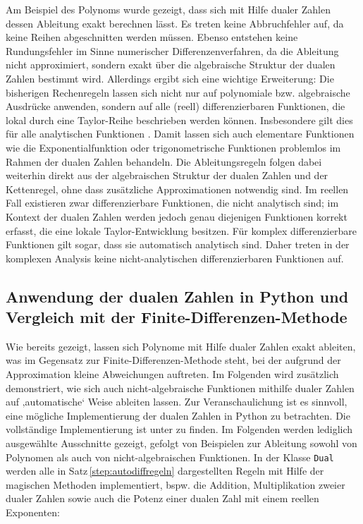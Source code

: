 Am Beispiel des Polynoms wurde gezeigt, dass sich mit Hilfe dualer Zahlen dessen Ableitung exakt berechnen lässt.
Es treten keine Abbruchfehler auf, da keine Reihen abgeschnitten werden müssen. 
Ebenso entstehen keine Rundungsfehler im Sinne numerischer Differenzenverfahren, da die Ableitung nicht approximiert, sondern exakt über die algebraische Struktur der dualen Zahlen bestimmt wird.
Allerdings ergibt sich eine wichtige Erweiterung: Die bisherigen Rechenregeln lassen sich nicht nur auf polynomiale bzw. algebraische Ausdrücke anwenden, sondern auf alle (reell) differenzierbaren Funktionen, die lokal durch eine Taylor-Reihe beschrieben werden können.
Insbesondere gilt dies für alle analytischen Funktionen \cite{step:baydin2018}.
Damit lassen sich auch elementare Funktionen wie die Exponentialfunktion oder trigonometrische Funktionen problemlos im Rahmen der dualen Zahlen behandeln.
Die Ableitungsregeln folgen dabei weiterhin direkt aus der algebraischen Struktur der dualen Zahlen und der Kettenregel, ohne dass zusätzliche Approximationen notwendig sind.
Im reellen Fall existieren zwar differenzierbare Funktionen, die nicht analytisch sind; im Kontext der dualen Zahlen werden jedoch genau diejenigen Funktionen korrekt erfasst, die eine lokale Taylor-Entwicklung besitzen.
Für komplex differenzierbare Funktionen gilt sogar, dass sie automatisch analytisch sind.
Daher treten in der komplexen Analysis keine nicht-analytischen differenzierbaren Funktionen auf.

\subsection{Anwendung der dualen Zahlen in Python und Vergleich mit der Finite-Differenzen-Methode}
%

Wie bereits gezeigt, lassen sich Polynome mit Hilfe dualer Zahlen exakt ableiten, was im Gegensatz zur Finite-Differenzen-Methode steht, bei der aufgrund der Approximation kleine Abweichungen auftreten.
Im Folgenden wird zusätzlich demonstriert, wie sich auch nicht-algebraische Funktionen mithilfe dualer Zahlen auf ‚automatische‘ Weise ableiten lassen.
Zur Veranschaulichung ist es sinnvoll, eine mögliche Implementierung der dualen Zahlen in Python zu betrachten.
Die vollständige Implementierung ist unter
\cite{step:pythonstep}
zu finden.
Im Folgenden werden lediglich ausgewählte Ausschnitte gezeigt, gefolgt von Beispielen zur Ableitung sowohl von Polynomen als auch von nicht-algebraischen Funktionen.
In der Klasse \texttt{Dual} werden alle in Satz\,\ref{step:autodiffregeln} dargestellten Regeln mit Hilfe der magischen Methoden implementiert, bspw. die Addition, Multiplikation zweier dualer Zahlen sowie auch die Potenz einer dualen Zahl mit einem reellen Exponenten:
%

